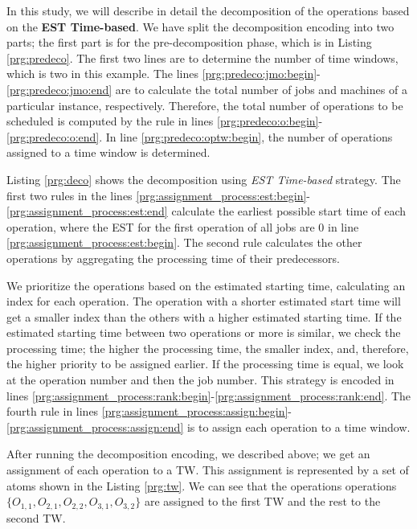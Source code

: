 \documentclass{tlp} %
\begin{document}
In this study, we will describe in detail the decomposition of the operations based on the \textbf{EST Time-based}. We have split the decomposition encoding into two parts; the first part is for the pre-decomposition phase, which is in Listing \ref{prg:predeco}. The first two lines are to determine the number of time windows, which is two in this example. The lines \ref{prg:predeco:jmo:begin}-\ref{prg:predeco:jmo:end} are to calculate the total number of jobs and machines of a particular instance, respectively. Therefore, the total number of operations to be scheduled is computed by the rule in lines \ref{prg:predeco:o:begin}-\ref{prg:predeco:o:end}. In line \ref{prg:predeco:optw:begin}, the number of operations assigned to a time window is determined. 


Listing \ref{prg:deco} shows the decomposition using \emph{EST Time-based} strategy. The first two rules in the lines \ref{prg:assignment_process:est:begin}-\ref{prg:assignment_process:est:end} calculate the earliest possible start time of each operation, where the EST for the first operation of all jobs are $0$ in line \ref{prg:assignment_process:est:begin}. The second rule calculates the other operations by aggregating the processing time of their predecessors. 

We prioritize the operations based on the estimated starting time, calculating an index for each operation. The operation with a shorter estimated start time will get a smaller index than the others with a higher estimated starting time. If the estimated starting time between two operations or more is similar, we check the processing time; the higher the processing time, the smaller index, and, therefore, the higher priority to be assigned earlier. If the processing time is equal, we look at the operation number and then the job number. This strategy is encoded in lines \ref{prg:assignment_process:rank:begin}-\ref{prg:assignment_process:rank:end}. The fourth rule in lines \ref{prg:assignment_process:assign:begin}-\ref{prg:assignment_process:assign:end} is to assign each operation to a time window.



After running the decomposition encoding, we described above; we get an assignment of each operation to a TW. This assignment is represented by a set of atoms shown in the Listing \ref{prg:tw}. We can see that the operations operations $\{ O_{1,1}, O_{2,1}, O_{2,2}, O_{3,1}, O_{3,2} \}$ are assigned to the first TW and the rest to the second TW.
\end{document}
